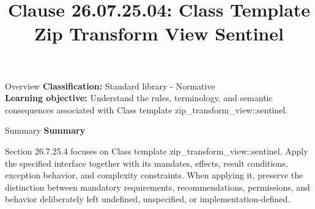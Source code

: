 \documentclass[10pt,letterpaper]{article}
\title{Clause 26.07.25.04: Class Template Zip Transform View Sentinel}
\author{}
\date{}
\begin{document}
\maketitle
\begin{CornellOverviewBox}{Overview}
\textbf{Classification:} Standard library - Normative\\[2pt]
\textbf{Learning objective:} Understand the rules, terminology, and semantic consequences associated with Class template zip\_transform\_view::sentinel.
\end{CornellOverviewBox}\begin{CornellSummaryBox}{Summary}
{\sffamily\bfseries\color{Accent} Summary}\par\vspace{3pt}Section 26.7.25.4 focuses on Class template zip\_transform\_view::sentinel. Apply the specified interface together with its mandates, effects, result conditions, exception behavior, and complexity constraints. When applying it, preserve the distinction between mandatory requirements, recommendations, permissions, and behavior deliberately left undefined, unspecified, or implementation-defined.
\end{CornellSummaryBox}
\end{document}
